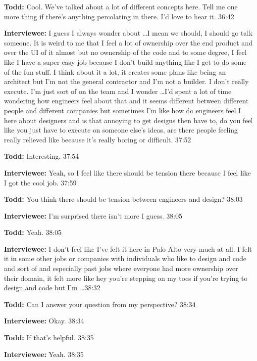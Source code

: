 \textbf{Todd:} Cool.  We've talked about a lot of different concepts here.  Tell me one more thing if there's anything percolating in there.  I'd love to hear it.  36:42

\textbf{Interviewee:} I guess I always wonder about \ldots I mean we should, I should go talk someone.  It is weird to me that I feel a lot of ownership over the end product and over the UI of it almost but no ownership of the code and to some degree, I feel like I have a super easy job because I don't build anything like I get to do some of the fun stuff.  I think about it a lot, it creates some plans like being an architect but I'm not the general contractor and I'm not a builder.  I don't really execute.  I'm just sort of on the team and I wonder \ldots I'd spent a lot of time wondering how engineers feel about that and it seems different between different people and different companies but sometimes I'm like how do engineers feel I here about designers and is that annoying to get designs then have to, do you feel like you just have to execute on someone else's ideas, are there people feeling really relieved like  because it's really boring or difficult.   37:52

\textbf{Todd:} Interesting.  37:54

\textbf{Interviewee:} Yeah, so I feel like there should be tension there because I feel like I got the cool job.  37:59

\textbf{Todd:} You think there should be tension between engineers and design?  38:03

\textbf{Interviewee:} I'm surprised there isn't more I guess.  38:05

\textbf{Todd:} Yeah.  38:05

\textbf{Interviewee:} I don't feel like I've felt it here in Palo Alto very much at all.  I felt it in some other jobs or companies with individuals who like to design and code and sort of and especially past jobs where everyone had more ownership over their domain, it felt more like hey you're stepping on my toes if you're trying to design and code but I'm \ldots 38:32

\textbf{Todd:} Can I answer your question from my perspective?  38:34

\textbf{Interviewee:} Okay.  38:34

\textbf{Todd:} If that's helpful.  38:35

\textbf{Interviewee:} Yeah.  38:35


